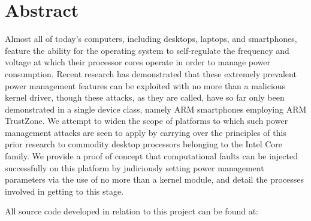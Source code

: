 \chapter*{Abstract}

Almost all of today's computers, including desktops, laptops, and
smartphones, feature the ability for the operating system to self-regulate
the frequency and voltage at which their processor cores operate in order
to manage power consumption. Recent research has demonstrated that these
extremely prevalent power management features can be exploited with no more
than a malicious kernel driver, though these \clkscrew{} attacks, as they
are called, have so far only been demonstrated in a single device class,
namely ARM smartphones employing ARM TrustZone. We attempt to widen the
scope of platforms to which such power management attacks are seen to apply
by carrying over the principles of this prior research to commodity desktop
processors belonging to the Intel Core family. We provide a proof of
concept that computational faults can be injected successfully on this
platform by judiciously setting power management parameters via the use of
no more than a kernel module, and detail the processes involved in getting
to this stage.

\vspace*{2em}

\begin{center}
    All source code developed in relation to this project can be found at:\\
    \href{https://git-teaching.cs.bham.ac.uk/mod-ug-proj-2018/nxp569}{}
\end{center}
